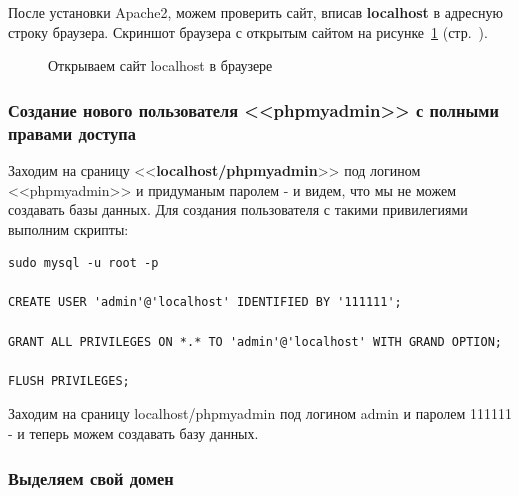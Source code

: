После установки Apache2, можем проверить сайт, вписав \textbf{localhost} в адресную строку браузера. Скриншот браузера с открытым сайтом на рисунке~\ref{fig:sudo-apt-install-apache2-step-7} (стр.~\pageref{fig:sudo-apt-install-apache2-step-7}).

\begin{figure}[!htp]
    \caption{Открываем сайт localhost в браузере}
    \label{fig:sudo-apt-install-apache2-step-7}
\end{figure}

\newpage

\subsubsection{Создание нового пользователя <<phpmyadmin>> с полными правами доступа}

Заходим на сраницу <<\textbf{localhost/phpmyadmin}>> под логином <<phpmyadmin>> и придуманым паролем - и видем, что мы не можем создавать базы данных. Для создания пользователя с такими привилегиями выполним скрипты:

\begin{verbatim}
sudo mysql -u root -p

CREATE USER 'admin'@'localhost' IDENTIFIED BY '111111';

GRANT ALL PRIVILEGES ON *.* TO 'admin'@'localhost' WITH GRAND OPTION;

FLUSH PRIVILEGES;
\end{verbatim}

Заходим на сраницу localhost/phpmyadmin под логином admin и паролем 111111 - и теперь можем создавать базу данных.

\subsubsection{Выделяем свой домен}

